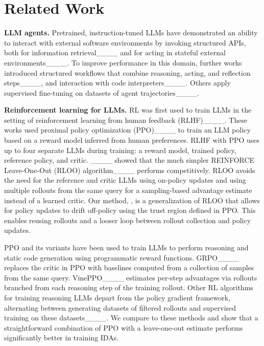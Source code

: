 \section{Related Work}
%
%
%
%
%
%
%
%
%
%
%
%
%
%
%
%
%
%
%
%
%


%

%

\textbf{LLM agents.}
Pretrained, instruction-tuned LLMs have demonstrated an ability to interact with external software environments by invoking structured APIs, both for information retrieval____ and for acting in stateful external environments____.
To improve performance in this domain, further works introduced structured workflows that combine reasoning, acting, and reflection steps____, and  interaction with code interpreters____. Others apply supervised fine-tuning on datasets of agent trajectories____.

\textbf{Reinforcement learning for LLMs.}
RL was first used to train LLMs in the setting of reinforcement learning from human feedback (RLHF)____.
These works used proximal policy optimization (PPO)____ to train an LLM policy based on a reward model inferred from human preferences.
RLHF with PPO uses up to four separate LLMs during training: a reward model, trained policy, reference policy, and critic.
%
____ showed that the much simpler REINFORCE Leave-One-Out (RLOO) algorithm____ performs competitively.
RLOO avoids the need for the reference and critic LLMs using on-policy updates and using multiple rollouts from the same query for a sampling-based advantage estimate instead of a learned critic.
Our method, \ours, is a generalization of RLOO that allows for policy updates to drift off-policy using the trust region defined in PPO.
This enables reusing rollouts and a looser loop between rollout collection and policy updates.

PPO and its variants have been used to train LLMs to perform reasoning and static code generation using programmatic reward functions. %
GRPO____ replaces the critic in PPO with baselines computed from a collection of samples from the same query.
VinePPO____ estimates per-step advantages via rollouts branched from each reasoning step of the training rollout.
Other RL algorithms for training reasoning LLMs depart from the policy gradient framework, alternating between generating datasets of filtered rollouts and supervised training on these datasets____.
We compare to these methods and show that a straightforward combination of PPO with a leave-one-out estimate performs significantly better in training IDAs.
%

